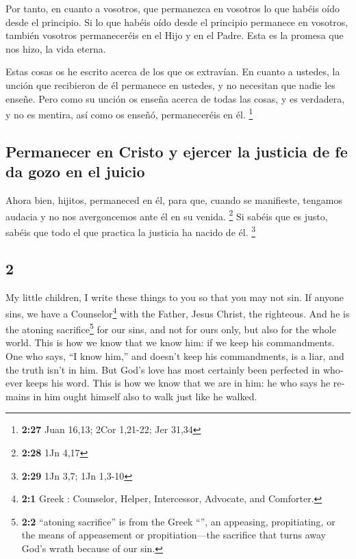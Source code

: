 \begin{paracol}{2}
 Por tanto, en cuanto a vosotros, que permanezca en
vosotros lo que habéis oído desde el principio. Si lo que habéis oído
desde el principio permanece en vosotros, también vosotros permaneceréis
en el Hijo y en el Padre.  Esta es la promesa que nos
hizo, la vida eterna.

 Estas cosas os he escrito acerca de los que os
extravían.  En cuanto a ustedes, la unción que recibieron
de él permanece en ustedes, y no necesitan que nadie les enseñe. Pero
como su unción os enseña acerca de todas las cosas, y es verdadera, y no
es mentira, así como os enseñó, permaneceréis en él. \footnote{\textbf{2:27}
  Juan 16,13; 2Cor 1,21-22; Jer 31,34}

\hypertarget{permanecer-en-cristo-y-ejercer-la-justicia-de-fe-da-gozo-en-el-juicio}{%
\subsection{Permanecer en Cristo y ejercer la justicia de fe da gozo en
el
juicio}\label{permanecer-en-cristo-y-ejercer-la-justicia-de-fe-da-gozo-en-el-juicio}}

 Ahora bien, hijitos, permaneced en él, para que, cuando
se manifieste, tengamos audacia y no nos avergoncemos ante él en su
venida. \footnote{\textbf{2:28} 1Jn 4,17}  Si sabéis que
es justo, sabéis que todo el que practica la justicia ha nacido de él.
\footnote{\textbf{2:29} 1Jn 3,7; 1Jn 1,3-10}

\switchcolumn
\begin{otherlanguage}{english}

\hypertarget{section-3}{%
\section{2}\label{section-3}}

 My little children, I write these things to you so that
you may not sin. If anyone sins, we have a Counselor\footnote{\textbf{2:1}
  Greek : Counselor, Helper, Intercessor, Advocate,
  and Comforter.} with the Father, Jesus Christ, the righteous.
 And he is the atoning sacrifice\footnote{\textbf{2:2}
  ``atoning sacrifice'' is from the Greek ``'', an
  appeasing, propitiating, or the means of appeasement or
  propitiation---the sacrifice that turns away God's wrath because of
  our sin.} for our sins, and not for ours only, but also for the whole
world.  This is how we know that we know him: if we keep
his commandments.  One who says, ``I know him,'' and
doesn't keep his commandments, is a liar, and the truth isn't in him.
 But God's love has most certainly been perfected in
whoever keeps his word. This is how we know that we are in him:
 he who says he remains in him ought himself also to walk
just like he walked.


\end{otherlanguage}
\end{paracol}
